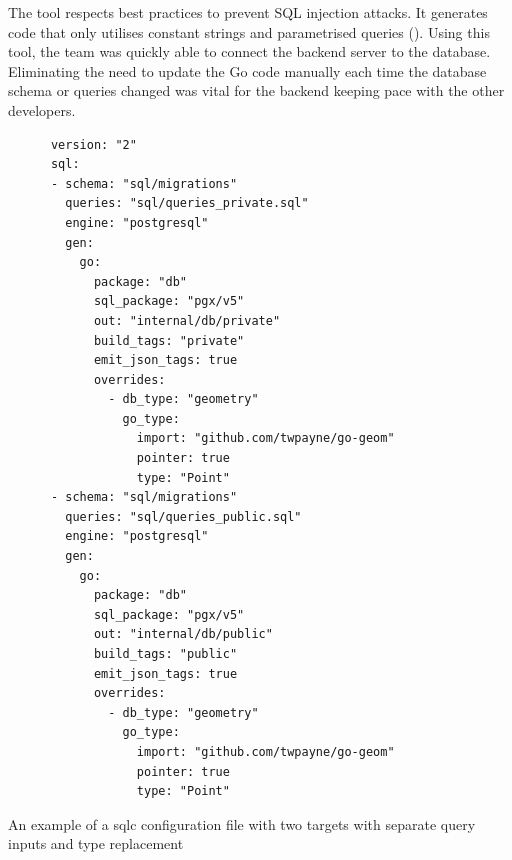 The tool respects best practices to prevent SQL injection attacks. It generates
code that only utilises constant strings and parametrised queries
(\cite{sqlc_injection}). Using this tool, the team was quickly able to
connect the backend server to the database. Eliminating the need to update the
Go code manually each time the database schema or queries changed was vital for
the backend keeping pace with the other developers.

\begin{listing}[htbp]
  \centering{}
  \begin{minipage}{0.75\textwidth}
  \begin{verbatim}
      version: "2"
      sql:
      - schema: "sql/migrations"
        queries: "sql/queries_private.sql"
        engine: "postgresql"
        gen:
          go:
            package: "db"
            sql_package: "pgx/v5"
            out: "internal/db/private"
            build_tags: "private"
            emit_json_tags: true
            overrides:
              - db_type: "geometry"
                go_type:
                  import: "github.com/twpayne/go-geom"
                  pointer: true
                  type: "Point"
      - schema: "sql/migrations"
        queries: "sql/queries_public.sql"
        engine: "postgresql"
        gen:
          go:
            package: "db"
            sql_package: "pgx/v5"
            out: "internal/db/public"
            build_tags: "public"
            emit_json_tags: true
            overrides:
              - db_type: "geometry"
                go_type:
                  import: "github.com/twpayne/go-geom"
                  pointer: true
                  type: "Point"
  \end{verbatim}
  \end{minipage}
  \caption{An example of a sqlc configuration file with two targets with separate query inputs and type replacement}
  \label{listing:sqlc_config_file}
\end{listing}

